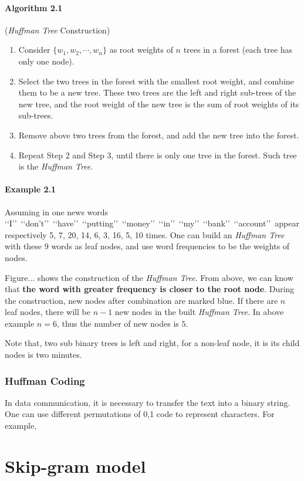 \paragraph{Algorithm 2.1}(\emph{Huffman Tree} Construction)
\begin{enumerate}
\item Consider $\{w_1,w_2,\cdots,w_n\}$ as root weights of $n$ trees in a forest (each tree has only one node).
\item Select the two trees in the forest with the smallest root weight, and combine them to be a new tree. These two trees are the left and right sub-trees of the new tree, and the root weight of the new tree is the sum of root weights of its sub-trees.
\item Remove above two trees from the forest, and add the new tree into the forest.
\item Repeat Step 2 and Step 3, until there is only one tree in the forest. Such tree is the \emph{Huffman Tree}.
\end{enumerate}
\paragraph{Example 2.1} Assuming in one news words \lq\lq I\rq\rq\ \lq\lq don't\rq\rq\ \lq\lq have\rq\rq\ \lq\lq putting\rq\rq\ \lq\lq money\rq\rq\ \lq\lq in\rq\rq\ \lq\lq my\rq\rq\ \lq\lq bank\rq\rq\ \lq\lq account\rq\rq\ appear respectively 5, 7, 20, 14, 6, 3, 16, 5, 10 times. One can build an \emph{Huffman Tree} with these 9 words as leaf nodes, and use word frequencies to be the weights of nodes.

Figure... shows the construction of the \emph{Huffman Tree}. From above, we can know that \textbf{the word with greater frequency is closer to the root node}. During the construction, new nodes after combination are marked blue. If there are $n$ leaf nodes, there will be $n-1$ new nodes in the built \emph{Huffman Tree}. In above example $n=6$, thus the number of new nodes is $5$. 

Note that, two sub binary trees is left and right, for a non-leaf node, it is its child nodes is two minutes.
\subsubsection{Huffman Coding}
In data communication, it is necessary to transfer the text into a binary string. One can use different permutations of 0,1 code to represent characters. For example, 



\section{Skip-gram model}


